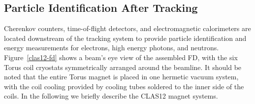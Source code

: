 \documentclass[final,3p,twocolumn]{elsarticle}
\begin{document}
\subsection{\rm Particle Identification After Tracking}   
Cherenkov counters, time-of-flight detectors,  
and electromagnetic calorimeters are located  downstream of the tracking system to provide particle identification and energy measurements for 
electrons, high energy photons, and neutrons.  Figure~\ref{clas12-fd} shows a beam's eye view of the assembled FD, with the
six Torus coil cryostats symmetrically arranged around the beamline. It should be noted that the entire Torus magnet is 
placed in one hermetic vacuum system, with the coil cooling provided by cooling tubes soldered to the inner side of the coils.  
In the following we briefly describe the CLAS12 magnet systems. 


\end{document}
